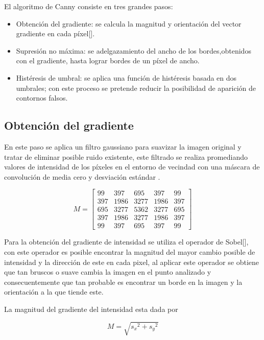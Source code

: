 El algoritmo de Canny consiste en tres grandes pasos: 

\begin{itemize}
\item Obtención del gradiente: se calcula la magnitud y orientación del vector gradiente en cada píxel[]. 
\item Supresión no máxima: se adelgazamiento del ancho de los bordes,obtenidos con el gradiente, hasta lograr bordes de un píxel de ancho. 
\item Histéresis de umbral: se aplica una función de histéresis basada en dos umbrales; con este proceso se pretende reducir la posibilidad de aparición de contornos falsos. 
\end{itemize}

\subsection{Obtención del gradiente}

En este paso se aplica un filtro gaussiano para suavizar la imagen original y tratar de eliminar posible ruido existente, este filtrado se realiza promediando valores de intensidad de los píxeles en el entorno de vecindad con una 
máscara de convolución de media cero y desviación estándar \sigma.

\begin{equation}
M =\begin{bmatrix}
99 & 397 & 695 & 397 & 99 \\ 
397 & 1986 & 3277 & 1986 & 397 \\ 
695 & 3277 & 5362 & 3277 & 695 \\ 
397 & 1986 & 3277 & 1986 & 397 \\ 
99 & 397 & 695 & 397 & 99
\end{bmatrix}
\end{equation}

Para la obtención del gradiente de intensidad se utiliza el operador de Sobel[], con este operador es posible encontrar la magnitud del mayor cambio posible de intensidad y la dirección de este en cada pixel, al aplicar este operador se obtiene que tan bruscos o suave cambia la imagen en el punto analizado y consecuentemente que tan probable es encontrar un borde en la imagen y la orientación a la que tiende este.

La magnitud del gradiente del intensidad esta dada por 

\begin{equation}
M=\sqrt{{s_{x}}^{2}+{s_{y}}^{2}}
\end{equation}

